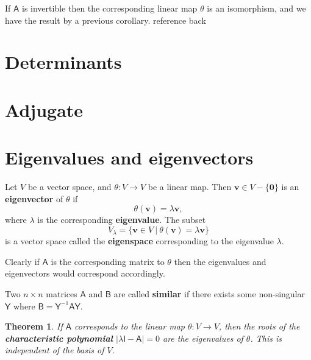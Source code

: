 \documentclass[letter-paper]{tufte-book}
\newtheorem{theorem}{\color{pastel-blue}Theorem}[section]
\newenvironment{proof}[1][Proof]{\begin{trivlist}
\item[\hskip \labelsep {\bfseries #1}]}{\end{trivlist}}
\begin{document}
\begin{proof}
  If $\mathsf{A}$ is invertible then the corresponding linear map $\theta$ is an
  isomorphism, and we have the result by a previous corollary. {\color{red}reference back}
\end{proof}


\section{Determinants}


\section{Adjugate}


\section{Eigenvalues and eigenvectors}

Let $V$ be a vector space, and $\theta:V \to V$ be a linear map. Then
$\boldsymbol{v}\in V-\{\boldsymbol{0}\}$ is an \textbf{eigenvector} of $\theta$
if
\begin{equation}
  \theta(\boldsymbol{v}) = \lambda \boldsymbol{v},
\end{equation}
where $\lambda$ is the corresponding \textbf{eigenvalue}. The subset
\begin{equation}
  V_{\lambda} = \{\boldsymbol{v}\in V \ |\ \theta(\boldsymbol{v}) = \lambda \boldsymbol{v}\}
\end{equation}
is a vector space called the \textbf{eigenspace} corresponding to the eigenvalue
$\lambda$.

Clearly if $\mathsf{A}$ is the corresponding matrix to $\theta$ then the
eigenvalues and eigenvectors would correspond accordingly.

Two $n\times n$ matrices $\mathsf{A}$ and $\mathsf{B}$ are called
\textbf{similar} if there exists some non-singular $\mathsf{Y}$ where
$\mathsf{B} = \mathsf{Y}^{-1}\mathsf{AY}$.

\begin{theorem}
  If $\mathsf{A}$ corresponds to the linear map $\theta:V\to V$, then the roots
  of the \textbf{characteristic polynomial} $|\lambda\mathsf{I} - \mathsf{A}| =
  0$ are the eigenvalues of $\theta$. This is independent of the basis of $V$.
\end{theorem}
\end{document}

